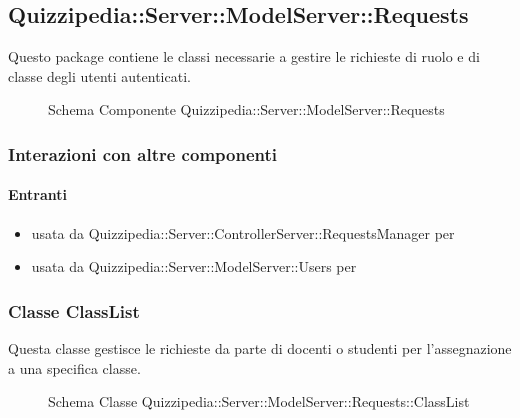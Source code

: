 \subsection{Quizzipedia::Server::ModelServer::Requests}
Questo package contiene le classi necessarie a gestire le richieste di ruolo e di classe degli utenti autenticati.
\begin{figure}[H]
\centering
\noindent{}
\caption[Schema Componente Quizzipedia::Server::ModelServer::Requests]{Schema Componente Quizzipedia::Server::ModelServer::Requests}
\end{figure}
\subsubsection{Interazioni con altre componenti}
\paragraph{Entranti}
\begin{itemize}
\item usata da Quizzipedia::Server::ControllerServer::RequestsManager per 
\item usata da Quizzipedia::Server::ModelServer::Users per 
\end{itemize}
\subsubsection{Classe ClassList}
Questa classe gestisce le richieste da parte di docenti o studenti per l'assegnazione a una specifica classe.
\begin{figure}[H]
\centering
\noindent{}
\caption[Schema Classe ClassList]{Schema Classe Quizzipedia::Server::ModelServer::Requests::ClassList}
\end{figure}

